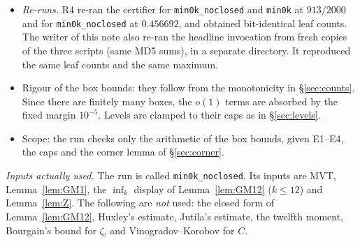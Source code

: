\documentclass[11pt]{amsart}
\theoremstyle{definition}
\theoremstyle{remark}
\begin{document}
\begin{itemize}[leftmargin=*]
\begin{itemize}[leftmargin=*]
\item the empty and corner tests, the caps and the acceptance test are recomputed;
\item the exact total volume of the leaves is checked to equal that of the initial cells, so no box is lost.
\end{itemize}
Result: $331\,054$ leaves at $\tau_{\rm hi}=913/2000$ and $586\,580$ at $\tau_{\rm hi}=114173/250000=0.456692$, with $0$ failures and with
equal volumes in both runs. The maxima agree with the certifier's. Usage: run it with \texttt{PYTHONPATH=numerics} from a scratch directory, since it writes a JSON file.
\item \emph{Re-runs.} R4 re-ran the certifier for \texttt{min0k\_noclosed} and \texttt{min0k} at $913/2000$ and for \texttt{min0k\_noclosed} at
$0.456692$, and obtained bit-identical leaf counts. The writer of this note also re-ran the headline invocation from fresh copies of the three
scripts (same MD5 sums), in a separate directory. It reproduced the same leaf counts and the same maximum.
\item Rigour of the box bounds: they follow from the monotonicity in \S\ref{sec:counts}. Since there are finitely many boxes, the $o(1)$ terms are
absorbed by the fixed margin $10^{-5}$. Levels are clamped to their caps as in \S\ref{sec:levels}.
\item Scope: the run checks only the arithmetic of the box bounds, given E1--E4, the caps and the corner lemma of \S\ref{sec:corner}.
\end{itemize}

\emph{Inputs actually used.} The run is called \texttt{min0k\_noclosed}. Its inputs are MVT, Lemma~\ref{lem:GM1}, the $\inf_k$ display of
Lemma~\ref{lem:GM12} ($k\le12$) and Lemma~\ref{lem:Z}. The following are \emph{not} used: the closed form of Lemma~\ref{lem:GM12}, Huxley's
estimate, Jutila's estimate, the twelfth moment, Bourgain's bound for $\zeta$, and Vinogradov--Korobov for $C$.
\end{document}
